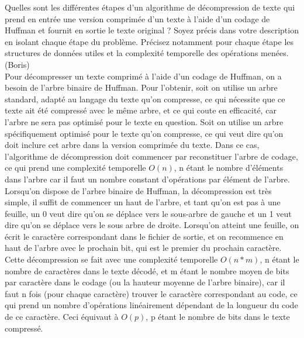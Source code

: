  Quelles sont les différentes étapes d’un algorithme de décompression de texte
qui prend en entrée une version comprimée d’un texte à l’aide d’un codage de
Huffman et fournit en sortie le texte original ? Soyez précis dans votre description
en isolant chaque étape du problème. Précisez notamment pour chaque étape les
structures de données utiles et la complexité temporelle des opérations menées. (Boris)\\


Pour décompresser un texte comprimé à l'aide d'un codage de Huffman, on a besoin de l'arbre binaire de Huffman. Pour l'obtenir, soit on utilise un arbre standard, adapté au langage du texte qu'on compresse, ce qui nécessite que ce texte ait été compressé avec le même arbre, et ce qui coute en efficacité, car l'arbre ne sera pas optimisé pour le texte en question. Soit on utilise un arbre spécifiquement optimisé pour le texte qu'on compresse, ce qui veut dire qu'on doit inclure cet arbre dans la version comprimée du texte. Dans ce cas, l'algorithme de décompression doit commencer par reconstituer l'arbre de codage, ce qui prend une complexité temporelle $O(n)$, n étant le nombre d'éléments dans l'arbre car il faut un nombre constant d'opérations par élément de l'arbre.
Lorsqu'on dispose de l'arbre binaire de Huffman, la décompression est très simple, il suffit de commencer un haut de l'arbre, et tant qu'on est pas à une feuille, un 0 veut dire qu'on se déplace vers le sous-arbre de gauche et un 1 veut dire qu'on se déplace vers le sous arbre de droite. Lorsqu'on atteint une feuille, on écrit le caractère correspondant dans le fichier de sortie, et on recommence en haut de l'arbre avec le prochain bit, qui est le premier du prochain caractère. Cette décompression se fait avec une complexité temporelle $O(n*m)$, n étant le nombre de caractères dans le texte décodé, et m étant le nombre moyen de bits par caractère dans le codage (ou la hauteur moyenne de l'arbre binaire), car il faut n fois (pour chaque caractère) trouver le caractère correspondant au code, ce qui prend un nombre d'opérations linéairement dépendant de la longueur du code de ce caractère. Ceci équivaut à $O(p)$, p étant le nombre de bits dans le texte compressé.